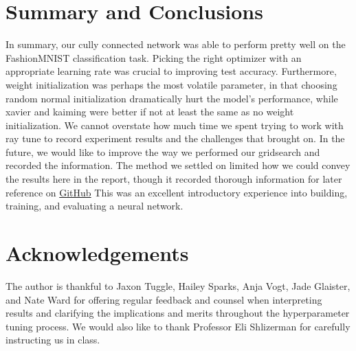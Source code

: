 \documentclass[10pt]{amsart}
\begin{document}
\section{Summary and Conclusions}\label{sec:conclusions} 
In summary, our cully connected network was able to perform pretty well on the FashionMNIST classification task.
Picking the right optimizer with an appropriate learning rate was crucial to improving test accuracy.
Furthermore, weight initialization was perhaps the most volatile parameter, in that choosing random normal initialization dramatically hurt the model's performance, while xavier and kaiming were better if not at least the same as no weight initialization.
We cannot overstate how much time we spent trying to work with ray tune to record experiment results and the challenges that brought on.
In the future, we would like to improve the way we performed our gridsearch and recorded the information.
The method we settled on limited how we could convey the results here in the report, though it recorded thorough information for later reference on \href{https://github.com/hunter-lybbert/uw-central/blob/main/data_analysis/hw_04/experiments/experiments.json}{GitHub}
This was an excellent introductory experience into building, training, and evaluating a neural network.

\section*{Acknowledgements}
The author is thankful to Jaxon Tuggle, Hailey Sparks, Anja Vogt, Jade Glaister, and Nate Ward for offering regular feedback and counsel when interpreting results and clarifying the implications and merits throughout the hyperparameter tuning process.
We would also like to thank Professor Eli Shlizerman for carefully instructing us in class.


\end{document}
